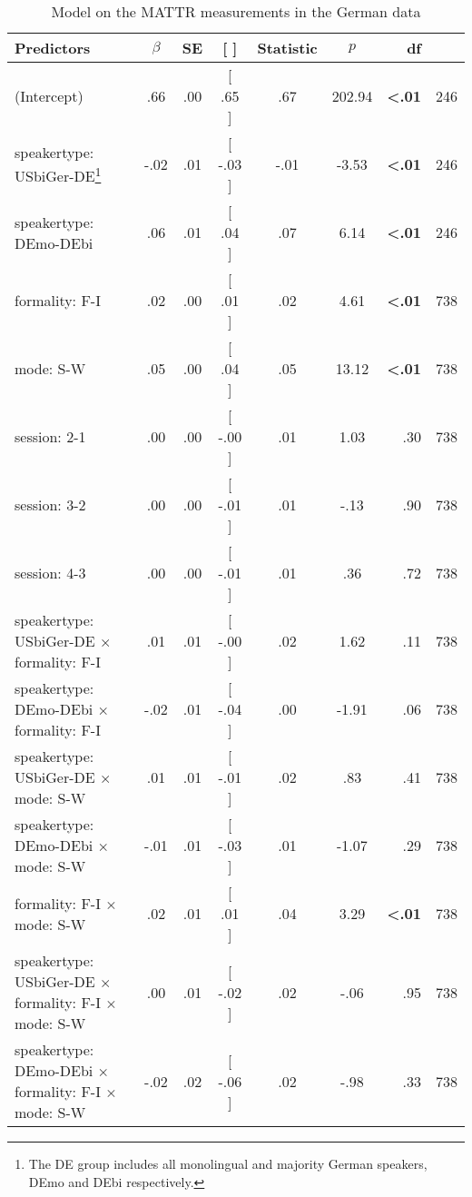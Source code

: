 \documentclass[output=paper,colorlinks,citecolor=brown]{langscibook}
\begin{document}
\begin{sidewaystable}
    \robustify\bfseries
    \small
    \caption{Model on the MATTR measurements in the German data}
    \begin{tabular}{l S[table-format=-1.2]
                      S[table-format=1.2]
                      >{[}S[table-format={[}-1.2]
                      @{, }
                      S[table-format=-1.2{]}]<{]}
                      S[table-format=3.2]
                      S[table-format=<1.2]
                      r
                    }
        \lsptoprule
        Predictors & {$\beta$} & {SE} &  & {Statistic} & {$p$} & {df} \\ \midrule
        (Intercept) & .66 & .00 & .65 & .67 & 202.94 & \bfseries <.01 & 246 \\
        speakertype: USbiGer-DE\footnote{The DE group includes all monolingual and majority German speakers, DEmo and DEbi respectively.} & -.02 & .01 & -.03 & -.01 & -3.53 & \bfseries <.01 & 246 \\ 
        speakertype: DEmo-DEbi & .06 & .01 & .04 & .07 & 6.14 & \bfseries <.01 & 246 \\ 
        formality: F-I & .02 & .00 & .01 & .02 & 4.61 & \bfseries <.01 & 738 \\ 
        mode: S-W & .05 & .00 & .04 & .05 & 13.12 & \bfseries <.01 & 738 \\ 
        session: 2-1 & .00 & .00 & -.00 & .01 & 1.03 & .30 & 738 \\ 
        session: 3-2 & .00 & .00 & -.01 & .01 & -.13 & .90 & 738 \\ 
        session: 4-3 & .00 & .00 & -.01 & .01 & .36 & .72 & 738 \\ 
        speakertype: USbiGer-DE × formality: F-I & .01 & .01 & -.00 & .02 & 1.62 & .11 & 738 \\ 
        speakertype: DEmo-DEbi × formality: F-I& -.02 & .01 & -.04 & .00 & -1.91 & .06 & 738 \\ 
        speakertype: USbiGer-DE × mode: S-W & .01 & .01 & -.01 & .02 & .83 & .41 & 738 \\ 
        speakertype: DEmo-DEbi × mode: S-W& -.01 & .01 & -.03 & .01 & -1.07 & .29 & 738 \\ 
        formality: F-I × mode: S-W& .02 & .01 & .01 & .04 & 3.29 & \bfseries <.01 & 738 \\ 
        speakertype: USbiGer-DE × formality: F-I  × mode: S-W & .00 & .01 & -.02 & .02 & -.06 & .95 & 738 \\ 
        speakertype: DEmo-DEbi × formality: F-I × mode: S-W & -.02 & .02 & -.06 & .02 & -.98 & .33 & 738 \\ 

\end{tabular}
\end{sidewaystable}
\end{document}
